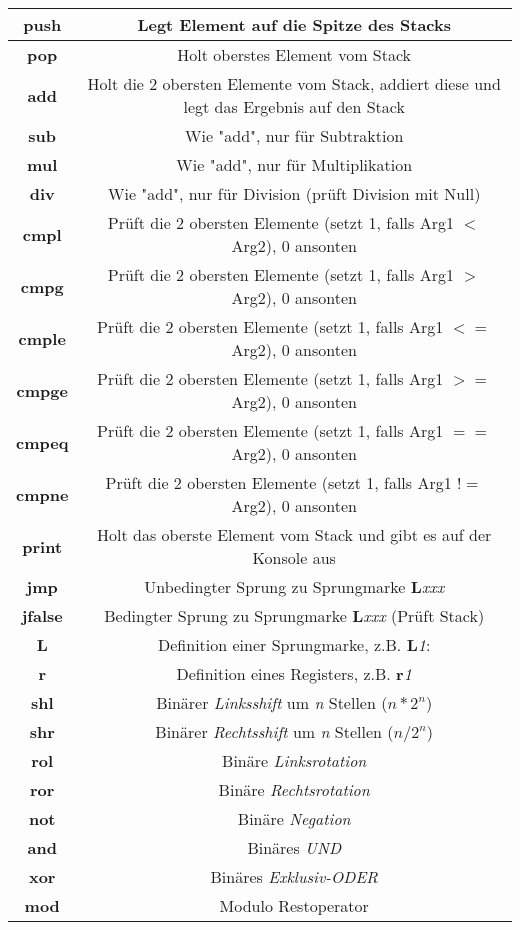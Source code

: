 \documentclass{article}
\begin{document}
\begin{tabular}{|c|c|}\hline
   \textbf{push} & Legt Element auf die Spitze des Stacks \\ \hline
   \textbf{pop} & Holt oberstes Element vom Stack \\ \hline
   \textbf{add} & Holt die 2 obersten Elemente vom Stack, addiert diese und legt das Ergebnis auf den Stack \\ \hline
   \textbf{sub} & Wie "add", nur für Subtraktion \\ \hline
   \textbf{mul} & Wie "add", nur für Multiplikation \\ \hline
   \textbf{div} & Wie "add", nur für Division (prüft Division mit Null) \\ \hline
   \textbf{cmpl} & Prüft die 2 obersten Elemente (setzt 1, falls Arg1 $<$  Arg2), 0 ansonten \\ \hline
   \textbf{cmpg} & Prüft die 2 obersten Elemente (setzt 1, falls Arg1 $>$  Arg2), 0 ansonten  \\ \hline         
   \textbf{cmple} & Prüft die 2 obersten Elemente (setzt 1, falls Arg1 $<=$ Arg2), 0 ansonten  \\ \hline        
   \textbf{cmpge} & Prüft die 2 obersten Elemente (setzt 1, falls Arg1 $>=$  Arg2), 0 ansonten  \\ \hline 
   \textbf{cmpeq} & Prüft die 2 obersten Elemente (setzt 1, falls Arg1 $==$  Arg2), 0 ansonten  \\ \hline      
   \textbf{cmpne} & Prüft die 2 obersten Elemente (setzt 1, falls Arg1 $!=$  Arg2), 0 ansonten  \\ \hline      
   \textbf{print} & Holt das oberste Element vom Stack und gibt es auf der Konsole aus \\ \hline       
   \textbf{jmp} & Unbedingter Sprung zu Sprungmarke \textbf{L}\textit{xxx}  \\ \hline         
   \textbf{jfalse} & Bedingter Sprung zu Sprungmarke \textbf{L}\textit{xxx} (Prüft Stack) \\ \hline
   \textbf{L} & Definition einer Sprungmarke, z.B. \textbf{L}\textit{1}:  \\ \hline           
   \textbf{r} & Definition eines Registers, z.B. \textbf{r}\textit{1} \\ \hline
   \textbf{shl} & Binärer \textit{Linksshift} um \textit{n} Stellen ($n * 2^n$) \\ \hline           
   \textbf{shr} & Binärer \textit{Rechtsshift} um \textit{n} Stellen ($n / 2^n$) \\ \hline         
   \textbf{rol} & Binäre \textit{Linksrotation} \\ \hline          
   \textbf{ror} & Binäre \textit{Rechtsrotation} \\ \hline
   \textbf{not} & Binäre \textit{Negation} \\ \hline
   \textbf{and} & Binäres \textit{UND} \\ \hline 
   \textbf{xor} & Binäres \textit{Exklusiv-ODER} \\ \hline		
   \textbf{mod} & Modulo Restoperator \\ \hline
\end{tabular}
\end{document}

